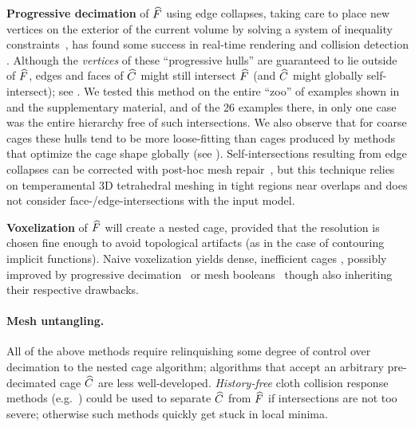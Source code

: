 \textbf{Progressive decimation} of $\widehat{F}$ using edge collapses, taking care
to place new vertices on the exterior of the current volume by solving a system
of inequality constraints~\cite{Sander:2000:SC}, has found some success in
real-time rendering and collision detection \cite{Platis:CGF}.  Although
the \emph{vertices} of these ``progressive hulls'' are guaranteed to lie
outside of $\widehat{F}$, edges and faces of $\widehat{C}$ might still
intersect $\widehat{F}$ (and $\widehat{C}$ might globally self-intersect); see
. We tested this method on the entire ``zoo'' of
examples shown in  and the supplementary material, and of the 26
examples there, in only one case was the entire hierarchy free of such
intersections. We also observe that for coarse cages these hulls tend to be
more loose-fitting than cages produced by methods that optimize the cage shape
globally (see ).  Self-intersections resulting from
edge collapses can be corrected with post-hoc mesh repair~\cite{Deng:2011vr},
but this technique relies on temperamental 3D tetrahedral meshing in tight
regions near overlaps and does not consider face-/edge-intersections with
the input model.

\textbf{Voxelization} of $\widehat{F}$ will create a nested cage, provided that
the resolution is chosen fine enough to avoid topological
artifacts (as in the case of contouring implicit functions). Naive voxelization
yields dense, inefficient cages \cite{Mehra:2009:AMS}, possibly improved by
progressive decimation~\cite{Xian:2009} or mesh booleans~\cite{Xian:2015}
though also inheriting their respective drawbacks.

\paragraph{Mesh untangling.}
%
All of the above methods require relinquishing some degree of control over
decimation to the nested cage algorithm; algorithms that accept an arbitrary
pre-decimated cage $\widehat{C}$ are less well-developed. \emph{History-free} cloth
collision response methods (e.g.\
\cite{Baraff:2003:UC,Volino:2006:RSC,Wicke:2006,Ye:2012:ICM}) could be used to
separate $\widehat{C}$ from $\widehat{F}$ if intersections are not too severe; otherwise
such methods quickly get stuck in local minima.

